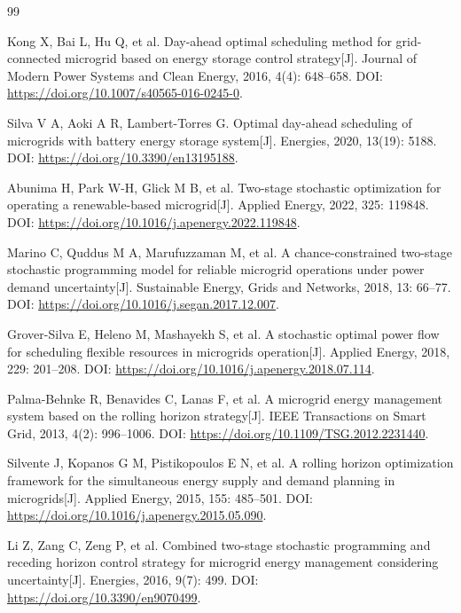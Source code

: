 \begin{thebibliography}{99}

Kong X, Bai L, Hu Q, et al.
Day-ahead optimal scheduling method for grid-connected microgrid based on energy storage control strategy[J].
Journal of Modern Power Systems and Clean Energy, 2016, 4(4): 648--658.
DOI: \url{https://doi.org/10.1007/s40565-016-0245-0}.

Silva V A, Aoki A R, Lambert-Torres G.
Optimal day-ahead scheduling of microgrids with battery energy storage system[J].
Energies, 2020, 13(19): 5188.
DOI: \url{https://doi.org/10.3390/en13195188}.

Abunima H, Park W-H, Glick M B, et al.
Two-stage stochastic optimization for operating a renewable-based microgrid[J].
Applied Energy, 2022, 325: 119848.
DOI: \url{https://doi.org/10.1016/j.apenergy.2022.119848}.

Marino C, Quddus M A, Marufuzzaman M, et al.
A chance-constrained two-stage stochastic programming model for reliable microgrid operations under power demand uncertainty[J].
Sustainable Energy, Grids and Networks, 2018, 13: 66--77.
DOI: \url{https://doi.org/10.1016/j.segan.2017.12.007}.

Grover-Silva E, Heleno M, Mashayekh S, et al.
A stochastic optimal power flow for scheduling flexible resources in microgrids operation[J].
Applied Energy, 2018, 229: 201--208.
DOI: \url{https://doi.org/10.1016/j.apenergy.2018.07.114}.

Palma-Behnke R, Benavides C, Lanas F, et al.
A microgrid energy management system based on the rolling horizon strategy[J].
IEEE Transactions on Smart Grid, 2013, 4(2): 996--1006.
DOI: \url{https://doi.org/10.1109/TSG.2012.2231440}.

Silvente J, Kopanos G M, Pistikopoulos E N, et al.
A rolling horizon optimization framework for the simultaneous energy supply and demand planning in microgrids[J].
Applied Energy, 2015, 155: 485--501.
DOI: \url{https://doi.org/10.1016/j.apenergy.2015.05.090}.

Li Z, Zang C, Zeng P, et al.
Combined two-stage stochastic programming and receding horizon control strategy for microgrid energy management considering uncertainty[J].
Energies, 2016, 9(7): 499.
DOI: \url{https://doi.org/10.3390/en9070499}.


\end{thebibliography}
